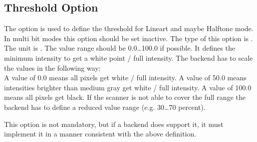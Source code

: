 \documentclass[11pt,DVIps]{report}
\begin{document}
\begin{changebar}
\subsection{Threshold Option}
The option  is used to define the threshold
for Lineart and maybe Halftone mode. In multi bit modes
this option should be set inactive.
The type of this option is .
The unit is . The value range
should be 0.0\ldots100.0 if possible.
It defines the minimum intensity to get a white point / full intensity.
The backend has to scale the values in the following way:\\

A value of 0.0 means all pixels get white / full intensity.  A value of 50.0
means intensities brighter than medium gray get white / full intensity.  A
value of 100.0 means all pixels get black. If the
scanner is not able to cover the full range the backend has to define a
reduced value range (e.g. 30\ldots70 percent).

This option is not mandatory, but if a backend does support it, it
must implement it in a manner consistent with the above definition.\\
\end{changebar}
\end{document}

